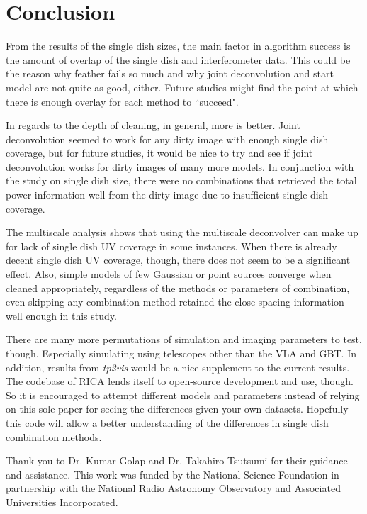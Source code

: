 \documentclass[preprint]{aastex63}
\begin{document}
\section{Conclusion}

From the results of the single dish sizes, the main factor in algorithm success is the amount of overlap of the single dish and interferometer data. This could be the reason why feather fails so much and why joint deconvolution and start model are not quite as good, either. Future studies might find the point at which there is enough overlay for each method to ``succeed". 

In regards to the depth of cleaning, in general, more is better. Joint deconvolution seemed to work for any dirty image with enough single dish coverage, but for future studies, it would be nice to try and see if joint deconvolution works for dirty images of many more models. In conjunction with the study on single dish size, there were no combinations that retrieved the total power information well from the dirty image due to insufficient single dish coverage.

The multiscale analysis shows that using the multiscale deconvolver can make up for lack of single dish UV coverage in some instances. When there is already decent single dish UV coverage, though, there does not seem to be a significant effect. Also, simple models of few Gaussian or point sources converge when cleaned appropriately, regardless of the methods or parameters of combination, even skipping any combination method retained the close-spacing information well enough in this study.

There are many more permutations of simulation and imaging parameters to test, though. Especially simulating using telescopes other than the VLA and GBT. In addition, results from \textit{tp2vis} would be a nice supplement to the current results. The codebase of RICA lends itself to open-source development and use, though. So it is encouraged to attempt different models and parameters instead of relying on this sole paper for seeing the differences given your own datasets. Hopefully this code will allow a better understanding of the differences in single dish combination methods. 




\acknowledgments
Thank you to Dr. Kumar Golap and Dr. Takahiro Tsutsumi for their guidance and assistance. This work was funded by the National Science Foundation in partnership with the National Radio Astronomy Observatory and Associated Universities Incorporated.
\end{document}
